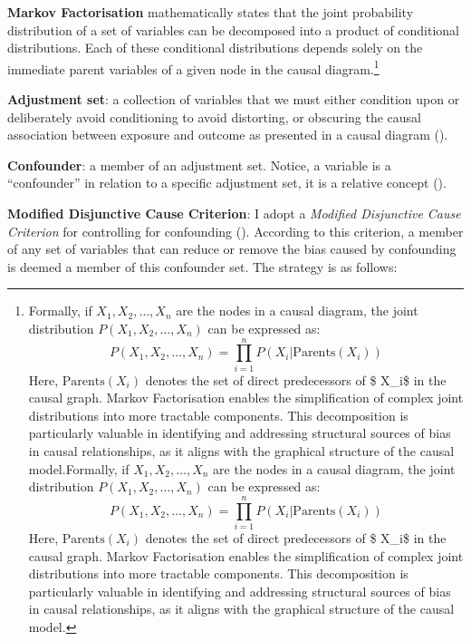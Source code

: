 \documentclass[
  singlecolumn,
  9pt]{article}
\begin{document}
\textbf{Markov Factorisation} mathematically states that the joint
probability distribution of a set of variables can be decomposed into a
product of conditional distributions. Each of these conditional
distributions depends solely on the immediate parent variables of a
given node in the causal diagram.\footnote{Formally, if
  \(X_1, X_2, \ldots, X_n\) are the nodes in a causal diagram, the joint
  distribution \(P(X_1, X_2, \ldots, X_n)\) can be expressed as: \[
  P(X_1, X_2, \ldots, X_n) = \prod_{i=1}^{n} P(X_i | \text{Parents}(X_i))
  \] Here, \(\text{Parents}(X_i)\) denotes the set of direct
  predecessors of \$ X\_i\$ in the causal graph. Markov Factorisation
  enables the simplification of complex joint distributions into more
  tractable components. This decomposition is particularly valuable in
  identifying and addressing structural sources of bias in causal
  relationships, as it aligns with the graphical structure of the causal
  model.Formally, if \(X_1, X_2, \ldots, X_n\) are the nodes in a causal
  diagram, the joint distribution \(P(X_1, X_2, \ldots, X_n)\) can be
  expressed as: \[
  P(X_1, X_2, \ldots, X_n) = \prod_{i=1}^{n} P(X_i | \text{Parents}(X_i))
  \] Here, \(\text{Parents}(X_i)\) denotes the set of direct
  predecessors of \$ X\_i\$ in the causal graph. Markov Factorisation
  enables the simplification of complex joint distributions into more
  tractable components. This decomposition is particularly valuable in
  identifying and addressing structural sources of bias in causal
  relationships, as it aligns with the graphical structure of the causal
  model.}

\textbf{Adjustment set}: a collection of variables that we must either
condition upon or deliberately avoid conditioning to avoid distorting,
or obscuring the causal association between exposure and outcome as
presented in a causal diagram ().

\textbf{Confounder}: a member of an adjustment set. Notice, a variable
is a ``confounder'' in relation to a specific adjustment set, it is a
relative concept ().

\textbf{Modified Disjunctive Cause Criterion}: I adopt a \emph{Modified
Disjunctive Cause Criterion} for controlling for confounding
(). According to this
criterion, a member of any set of variables that can reduce or remove
the bias caused by confounding is deemed a member of this confounder
set. The strategy is as follows:
\end{document}
